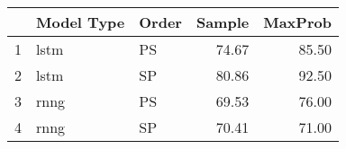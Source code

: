 \begin{tabular}{rllrr}
  \hline
 & Model Type & Order & Sample & MaxProb \\ 
  \hline
1 & lstm & PS & 74.67 & 85.50 \\ 
  2 & lstm & SP & 80.86 & 92.50 \\ 
  3 & rnng & PS & 69.53 & 76.00 \\ 
  4 & rnng & SP & 70.41 & 71.00 \\ 
   \hline
\end{tabular}
